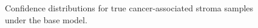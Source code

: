 \begin{figure}[htbp]
    \centering
    
    \caption{Confidence distributions for true cancer-associated stroma samples
    under the base model.}
    \label{fig:baseline224-stroma-confidence}
\end{figure}
